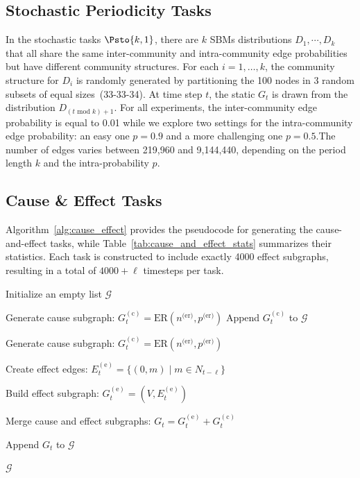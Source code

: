 \subsection{Stochastic Periodicity Tasks}\label{appendix:periodicity_stochastic_design}
In the stochastic tasks $\Psto{k,1}$, there are $k$ SBMs distributions $D_1,\cdots, D_k$ that all share the same inter-community and intra-community edge probabilities but have different community structures. For each $i=1,\dots,k$, the community structure for $D_i$ is randomly generated by partitioning the 100 nodes in 3 random subsets of equal sizes~(33-33-34).  At time step $t$, the static $G_t$ is drawn from the distribution $D_{(t \text{ mod } k) +1}$. 
For all experiments, the inter-community edge probability is equal to 0.01 while we explore two settings for the intra-community edge probability: an easy one $p=0.9$ and a more challenging one $p=0.5$.The number of edges varies between 219,960 and 9,144,440, depending on the period length $k$ and the intra-probability $p$.


\subsection{Cause \& Effect Tasks}
Algorithm~\ref{alg:cause_effect} provides the pseudocode for generating the cause-and-effect tasks, while Table~\ref{tab:cause_and_effect_stats} summarizes their statistics. Each task is constructed to include exactly 4000 effect subgraphs, resulting in a total of \( 4000 + \ell \) timesteps per task.

\begin{algorithm}[hbt!]
\caption{Cause \& Effect Task Generation}\label{alg:two}
\label{alg:cause_effect}


Initialize an empty list $\mathcal{G}$\;

 {
    Generate cause subgraph: $G^{(\text{c})}_t = \text{ER}(n^{\text{(er)}}, p^{\text{(er)}})$\;
    Append $G^{(\text{c})}_t$ to $\mathcal{G}$\;
}

 {
    Generate cause subgraph: $G^{(\text{c})}_t = \text{ER}(n^{\text{(er)}}, p^{\text{(er)}})$\;
    
    Create effect edges: $E^{(\text{e})}_t = \{(0, m) \mid m \in N_{t-\ell}\}$\;
    
    Build effect subgraph: $G^{(\text{e})}_t = (V, E^{(\text{e})}_t)$\;
    
    Merge cause and effect subgraphs: $G_t = G^{(\text{e})}_t + G^{(\text{c})}_t$\;
    
    Append $G_t$ to $\mathcal{G}$\;
}
\Return $\mathcal{G}$
\end{algorithm}


